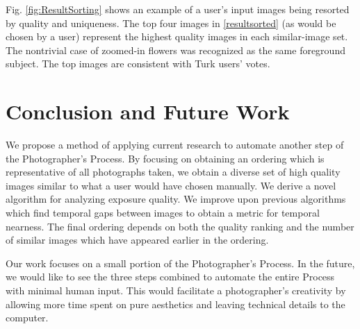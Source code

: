 \documentclass{sig-alternate}
\begin{document}
Fig. \ref{fig:ResultSorting} shows an example of a user's input images being resorted by quality and uniqueness. The top four images in \ref{resultsorted} (as would be chosen by a user) represent the highest quality images in each similar-image set. The nontrivial case of zoomed-in flowers was recognized as the same foreground subject. The top images are consistent with Turk users' votes.


\section{Conclusion and Future Work}
We propose a method of applying current research to automate another step of the Photographer's Process. By focusing on obtaining an ordering which is representative of all photographs taken, we obtain a diverse set of high quality images similar to what a user would have chosen manually. We derive a novel algorithm for analyzing exposure quality. We improve upon previous algorithms which find temporal gaps between images to obtain a metric for temporal nearness. The final ordering depends on both the quality ranking and the number of similar images which have appeared earlier in the ordering.

Our work focuses on a small portion of the Photographer's Process. In the future, we would like to see the three steps combined to automate the entire Process with minimal human input. This would facilitate a photographer's creativity by allowing more time spent on pure aesthetics and leaving technical details to the computer.

{
 
 
}
\end{document}
